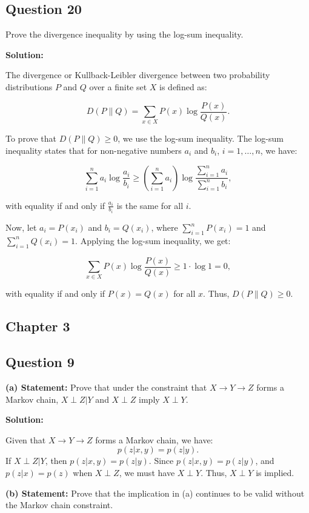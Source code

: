 \documentclass[a4paper,10pt]{article}
\begin{document}
\subsection*{Question 20}
Prove the divergence inequality by using the log-sum inequality.

\textbf{Solution:}

The divergence or Kullback-Leibler divergence between two probability distributions $ P $ and $ Q $ over a finite set $ X $ is defined as:

$$
D(P \| Q) = \sum_{x \in X} P(x) \log \frac{P(x)}{Q(x)}.
$$

To prove that $ D(P \| Q) \geq 0 $, we use the log-sum inequality. The log-sum inequality states that for non-negative numbers $ a_i $ and $ b_i $, $ i = 1, \dots, n $, we have:

$$
\sum_{i=1}^{n} a_i \log \frac{a_i}{b_i} \geq \left(\sum_{i=1}^{n} a_i\right) \log \frac{\sum_{i=1}^{n} a_i}{\sum_{i=1}^{n} b_i},
$$

with equality if and only if $ \frac{a_i}{b_i} $ is the same for all $ i $.

Now, let $ a_i = P(x_i) $ and $ b_i = Q(x_i) $, where $ \sum_{i=1}^{n} P(x_i) = 1 $ and $ \sum_{i=1}^{n} Q(x_i) = 1 $. Applying the log-sum inequality, we get:

$$
\sum_{x \in X} P(x) \log \frac{P(x)}{Q(x)} \geq 1 \cdot \log 1 = 0,
$$

with equality if and only if $ P(x) = Q(x) $ for all $ x $. Thus, $ D(P \| Q) \geq 0 $.


\subsection{Chapter 3}

\subsection*{Question 9}
\textbf{(a) Statement:} Prove that under the constraint that $ X \to Y \to Z $ forms a Markov chain, $ X \perp Z | Y $ and $ X \perp Z $ imply $ X \perp Y $.

\textbf{Solution:}

Given that $ X \to Y \to Z $ forms a Markov chain, we have:
$$
p(z|x,y) = p(z|y).
$$
If $ X \perp Z | Y $, then $ p(z|x,y) = p(z|y) $. Since $ p(z|x,y) = p(z|y) $, and $ p(z|x) = p(z) $ when $ X \perp Z $, we must have $ X \perp Y $. Thus, $ X \perp Y $ is implied.

\textbf{(b) Statement:} Prove that the implication in (a) continues to be valid without the Markov chain constraint.
\end{document}
